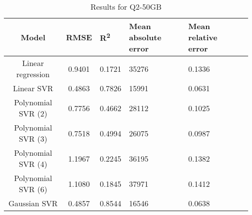 \begin{table}[H]
\centering
\begin{adjustbox}{center}
\begin{tabular}{c | c M{1.2cm} M{2.5cm} M{2.5cm} M{1.8cm}}
Model & RMSE & R\textsuperscript{2} & Mean absolute error & Mean relative error \tabularnewline
\hline
Linear regression & 0.9401 & 0.1721 &  35276 & 0.1336 \\
Linear SVR & 0.4863 & 0.7826 &  15991 & 0.0631 \\
Polynomial SVR (2) & 0.7756 & 0.4662 &  28112 & 0.1025 \\
Polynomial SVR (3) & 0.7518 & 0.4994 &  26075 & 0.0987 \\
Polynomial SVR (4) & 1.1967 & 0.2245 &  36195 & 0.1382 \\
Polynomial SVR (6) & 1.1080 & 0.1845 &  37971 & 0.1412 \\
Gaussian SVR & 0.4857 & 0.8544 &  16546 & 0.0638 \\
\end{tabular}
\end{adjustbox}
\\
\caption{Results for Q2-50GB}
\label{tab:all_linear_Q2_50}
\end{table}
